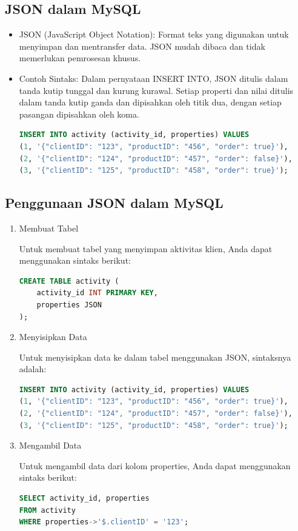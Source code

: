 \documentclass{article}
\begin{document}
\subsection{JSON dalam MySQL}
\begin{itemize}
    \item JSON (JavaScript Object Notation): Format teks yang digunakan untuk menyimpan dan mentransfer data. JSON mudah dibaca dan tidak memerlukan pemrosesan khusus.
    \item Contoh Sintaks: Dalam pernyataan INSERT INTO, JSON ditulis dalam tanda kutip tunggal dan kurung kurawal. Setiap properti dan nilai ditulis dalam tanda kutip ganda dan dipisahkan oleh titik dua, dengan setiap pasangan dipisahkan oleh koma.
          \begin{lstlisting}[language=SQL, caption={}, captionpos=b]
INSERT INTO activity (activity_id, properties) VALUES
(1, '{"clientID": "123", "productID": "456", "order": true}'),
(2, '{"clientID": "124", "productID": "457", "order": false}'),
(3, '{"clientID": "125", "productID": "458", "order": true}');
\end{lstlisting}
\end{itemize}

\subsection{Penggunaan JSON dalam MySQL}
\begin{enumerate}
    \item Membuat Tabel

          Untuk membuat tabel yang menyimpan aktivitas klien, Anda dapat menggunakan sintaks berikut:
          \begin{lstlisting}[language=SQL, caption={}, captionpos=b]
CREATE TABLE activity (
    activity_id INT PRIMARY KEY,
    properties JSON
);
\end{lstlisting}
    \item Menyisipkan Data

          Untuk menyisipkan data ke dalam tabel menggunakan JSON, sintaksnya adalah:
          \begin{lstlisting}[language=SQL, caption={}, captionpos=b]
INSERT INTO activity (activity_id, properties) VALUES
(1, '{"clientID": "123", "productID": "456", "order": true}'),
(2, '{"clientID": "124", "productID": "457", "order": false}'),
(3, '{"clientID": "125", "productID": "458", "order": true}');
\end{lstlisting}

    \item Mengambil Data

          Untuk mengambil data dari kolom properties, Anda dapat menggunakan sintaks berikut:
          \begin{lstlisting}[language=SQL, caption={}, captionpos=b]
SELECT activity_id, properties 
FROM activity 
WHERE properties->'$.clientID' = '123';
\end{lstlisting}
\end{enumerate}
\end{document}
